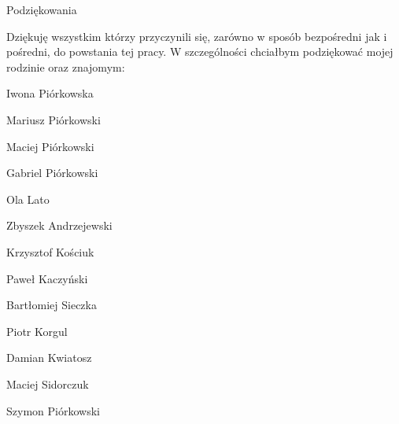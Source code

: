 \noindent
{\Large Podziękowania}
\bigskip

Dziękuję wszystkim którzy przyczynili się, zarówno w sposób bezpośredni jak i pośredni, do powstania tej pracy. W szczególności chciałbym podziękować mojej rodzinie oraz znajomym:

Iwona Piórkowska

Mariusz Piórkowski

Maciej Piórkowski

Gabriel Piórkowski

Ola Lato

Zbyszek Andrzejewski

Krzysztof Kościuk

Paweł Kaczyński

Bartłomiej Sieczka

Piotr Korgul

Damian Kwiatosz

Maciej Sidorczuk

\bigskip

{\raggedleft
Szymon Piórkowski

}

